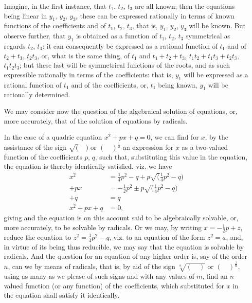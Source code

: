 \documentclass[12pt,a4paper]{article}
\theoremstyle{plain}
\theoremstyle{definition}
\theoremstyle{remark}
\begin{document}
Imagine, in the first instance, that $t_1$, $t_2$, $t_3$ are all known; then the equations being linear in $y_1$, $y_2$, $y_3$, these can be expressed rationally in terms of known functions of the coefficients and of $t_1$, $t_2$, $t_3$, that is, $y_1$, $y_2$, $y_3$ will be known. But observe further, that $y_1$ is obtained as a function of $t_1$, $t_2$, $t_3$ symmetrical as regards $t_2$, $t_3$: it can consequently be expressed as a rational function of $t_1$ and of $t_2 + t_3$, $t_2 t_3$, or, what is the same thing, of $t_1$ and $t_1 + t_2 + t_3$, $t_1 t_2 + t_1 t_3 + t_2 t_3$, $t_1 t_2 t_3$; but these last will be symmetrical functions of the roots, and as such expressible rationally in terms of the coefficients: that is, $y_1$ will be expressed as a rational function of $t_1$ and of the coefficients, or, $t_1$ being known, $y_1$ will be rationally determined.

We may consider now the question of the algebraical solution of equations, or, more accurately, that of the solution of equations by radicals.

In the case of a quadric equation $x^2 + px + q = 0$, we can find for $x$, by the assistance of the sign $\surd(\quad)$ or $(\quad)^{\frac{1}{2}}$ an expression for $x$ as a two-valued function of the coefficients $p$, $q$, such that, substituting this value in the equation, the equation is thereby identically satisfied, viz. we have
\begin{align*}
x^2 &= \tfrac{1}{4}p^2 - q + p\surd(\tfrac{1}{4}p^2 - q) \\
+ px &= -\tfrac{1}{2}p^2 \pm p\surd(\tfrac{1}{4}p^2 - q) \\
+ q &= q \\
\hline
x^2 + px + q &= 0,
\end{align*}
giving and the equation is on this account said to be algebraically solvable, or, more accurately, to be solvable by radicals. Or we may, by writing $x = -\frac{1}{2}p + z$, reduce the equation to $z^2 = \frac{1}{4}p^2 - q$, viz. to an equation of the form $z^2 = a$, and, in virtue of its being thus reducible, we may say that the equation is solvable by radicals. And the question for an equation of any higher order is, say of the order $n$, can we by means of radicals, that is, by aid of the sign $\sqrt[n]{(\quad)}$ or $(\quad)^{\frac{1}{n}}$, using as many as we please of such signs and with any values of $m$, find an $n$-valued function (or any function) of the coefficients, which substituted for $x$ in the equation shall satisfy it identically.
\end{document}
